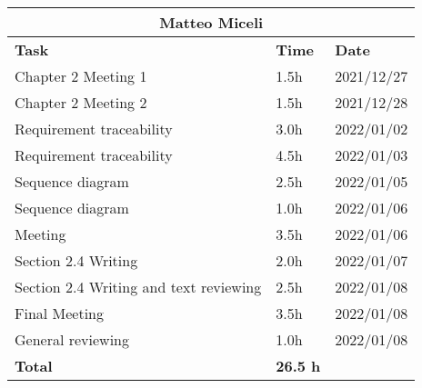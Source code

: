 \begin{table}[H]
\centering
\begin{tabular}{|p{}|p{}|p{}|}
\hline
\multicolumn{3}{|c|}{\textbf{Matteo Miceli}}            \\ \hline
\textbf{Task}                   & \textbf{Time} & \textbf{Date} \\ \hline

Chapter 2 Meeting 1				&		1.5h	   &	2021/12/27 \\ \hline
Chapter 2 Meeting 2				&		1.5h	   &	2021/12/28 \\ \hline
Requirement traceability		&		3.0h	   &	2022/01/02 \\ \hline
Requirement traceability		&		4.5h	   &	2022/01/03 \\ \hline
Sequence diagram 				&		2.5h	   &	2022/01/05 \\ \hline
Sequence diagram 				&		1.0h	   &	2022/01/06 \\ \hline
Meeting							&		3.5h	   &	2022/01/06 \\ \hline
Section 2.4 Writing			&		2.0h	   &	2022/01/07 \\ \hline
Section 2.4 Writing and text reviewing		 	&		2.5h	   &	2022/01/08 \\ \hline
Final Meeting					&		3.5h	   &	2022/01/08 \\ \hline
General reviewing 		&  1.0h & 2022/01/08 \\ \hline

\textbf{Total}                  		&  \textbf{26.5 h}   & \\ \hline
\end{tabular}
\end{table}
